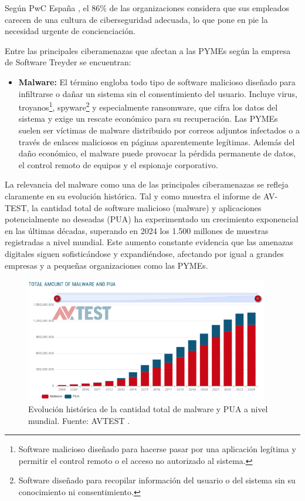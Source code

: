 \documentclass[a4paper, 11pt]{article}
\begin{document}
Según PwC España \cite{pwc}, el 86\% de las organizaciones considera que sus empleados carecen de una cultura de ciberseguridad adecuada, lo que pone en pie la necesidad urgente de concienciación.


Entre las principales ciberamenazas que afectan a las PYMEs según la empresa de Software Treyder \cite{treyder} se encuentran:

\begin{itemize}
    \item \textbf{Malware:}  
    El término engloba todo tipo de software malicioso diseñado para infiltrarse o dañar un sistema sin el consentimiento del usuario. Incluye virus, troyanos\footnote{Software malicioso diseñado para hacerse pasar por una aplicación legítima y permitir el control remoto o el acceso no autorizado al sistema.}, spyware\footnote{Software diseñado para recopilar información del usuario o del sistema sin su conocimiento ni consentimiento.} y especialmente ransomware, que cifra los datos del sistema y exige un rescate económico para su recuperación. Las PYMEs suelen ser víctimas de malware distribuido por correos adjuntos infectados o a través de enlaces maliciosos en páginas aparentemente legítimas. Además del daño económico, el malware puede provocar la pérdida permanente de datos, el control remoto de equipos y el espionaje corporativo.
\end{itemize}

La relevancia del malware como una de las principales ciberamenazas se refleja claramente en su evolución histórica. Tal y como muestra el informe de AV-TEST, la cantidad total de software malicioso (malware) y aplicaciones potencialmente no deseadas (PUA) ha experimentado un crecimiento exponencial en las últimas décadas, superando en 2024 los 1.500 millones de muestras registradas a nivel mundial. Este aumento constante evidencia que las amenazas digitales siguen sofisticándose y expandiéndose, afectando por igual a grandes empresas y a pequeñas organizaciones como las PYMEs.

\vspace{0.3cm}

\begin{figure}[H]
    \centering
    \includegraphics[width=0.95\textwidth]{images/malware.png}
    \caption{Evolución histórica de la cantidad total de malware y PUA a nivel mundial. Fuente: AVTEST \cite{avtest}.}
\end{figure}
\end{document}
